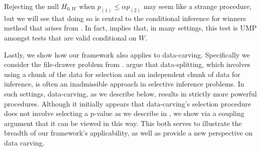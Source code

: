\documentclass{article}
\begin{document}
Rejecting the null $H_{0, W}$ when $p_{(1)} \leq \alpha p_{(2)}$ may seem like a strange procedure, but we will see that doing so is central to the conditional inference for winners method that arises from \cite{Fithian2017}. In fact, \cite{Fithian2017} implies that, in many settings, this test is UMP amongst tests that are valid conditional on $W$. 

Lastly, we show how our framework also applies to data-carving. Specifically we consider the file-drawer problem from \cite{Fithian2017}.  \cite{Fithian2017} argue that data-splitting, which involves using a chunk of the data for selection and an independent chunk of data for inference, is often an inadmissible approach in selective inference problems. In such settings, data-carving, as we describe below, results in strictly more powerful procedures. Although it initially appears that data-carving's selection procedure does not involve selecting a p-value as we describe in , we show via a coupling argument that it can be viewed in this way. This both serves to illustrate the breadth of our framework's applicability, as well as provide a new perspective on data carving. 
\end{document}
